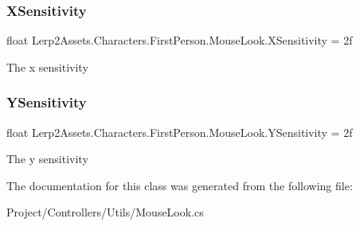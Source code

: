 \subsubsection{\texorpdfstring{X\+Sensitivity}{XSensitivity}}
{\footnotesize\ttfamily float Lerp2\+Assets.\+Characters.\+First\+Person.\+Mouse\+Look.\+X\+Sensitivity = 2f}



The x sensitivity 

\mbox{\label{class_lerp2_assets_1_1_characters_1_1_first_person_1_1_mouse_look_af055db3a223fab3158e245db34f1fc80}} 
\subsubsection{\texorpdfstring{Y\+Sensitivity}{YSensitivity}}
{\footnotesize\ttfamily float Lerp2\+Assets.\+Characters.\+First\+Person.\+Mouse\+Look.\+Y\+Sensitivity = 2f}



The y sensitivity 



The documentation for this class was generated from the following file\+:\begin{DoxyCompactItemize}
\item 
Project/\+Controllers/\+Utils/Mouse\+Look.\+cs\end{DoxyCompactItemize}

